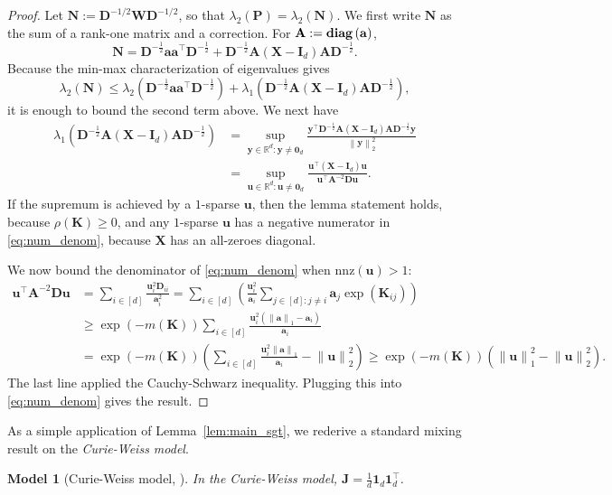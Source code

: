 \documentclass[11pt]{article}
\newtheorem{model}{Model}
\newcommand{\defeq}{:=}
\newcommand{\norm}[1]{\left\lVert#1\right\rVert}
\newcommand{\lam}{\lambda}
\newcommand{\R}{\mathbb{R}}
\newcommand{\diag}[1]{\textbf{\textup{diag}}\left(#1\right)}
\newcommand{\half}{\frac{1}{2}}
\newcommand{\1}{\mathbf{1}}
\newcommand{\0}{\mathbf{0}}
\newcommand{\id}{\mathbf{I}}
\newcommand{\Par}[1]{\left(#1\right)}
\newcommand{\nnz}{\mathrm{nnz}}
\newcommand{\ma}{{\mathbf{A}}}
\newcommand{\md}{{\mathbf{D}}}
\newcommand{\mj}{{\mathbf{J}}}
\newcommand{\mk}{{\mathbf{K}}}
\newcommand{\mn}{{\mathbf{N}}}
\newcommand{\mpp}{{\mathbf{P}}}
\newcommand{\mw}{{\mathbf{W}}}
\newcommand{\mx}{{\mathbf{X}}}
\newcommand{\va}{{\mathbf{a}}}
\newcommand{\vu}{{\mathbf{u}}}
\newcommand{\vy}{{\mathbf{y}}}
\begin{document}
\begin{proof}
Let $\mn \defeq \md^{-1/2}\mw\md^{-1/2}$, so that $\lam_2(\mpp) = \lam_2(\mn)$.
We first write $\mn$ as the sum of a rank-one matrix and a correction. For $\ma \defeq \diag{\va}$,
\[\mn = \md^{-\half}\va\va^\top \md^{-\half} + \md^{-\half}\ma \Par{\mx - \id_d}\ma\md^{-\half}.\]
Because the min-max characterization of eigenvalues gives
\[\lam_2\Par{\mn} \le \lam_2\Par{\md^{-\half}\va\va^\top\md^{-\half}} + \lam_1\Par{ \md^{-\half}\ma \Par{\mx - \id_d}\ma\md^{-\half}},\]
it is enough to bound the second term above.
We next have
\begin{equation}\label{eq:num_denom}\begin{aligned}\lam_1\Par{ \md^{-\half}\ma \Par{\mx - \id_d}\ma\md^{-\half}} &= \sup_{\vy \in \R^d: \vy \neq \0_d} \frac{\vy^\top\md^{-\half}\ma(\mx - \id_d)\ma\md^{-\half}\vy}{\norm{\vy}_2^2} \\ 
&= \sup_{\vu \in \R^d: \vu \neq \0_d} \frac{\vu^\top (\mx - \id_d) \vu}{\vu^\top \ma^{-2}\md\vu}.
\end{aligned}\end{equation}
If the supremum is achieved by a $1$-sparse $\vu$, then the lemma statement holds, because $\rho(\mk) \ge 0$, and any $1$-sparse $\vu$ has a negative numerator in \eqref{eq:num_denom}, because $\mx$ has an all-zeroes diagonal.

We now bound the denominator of \eqref{eq:num_denom} when $\nnz(\vu) > 1$:
\begin{align*}
\vu^\top \ma^{-2} \md \vu &= \sum_{i \in [d]} \frac{\vu_i^2 \md_{ii}}{\va_i^2} = \sum_{i \in [d]} \Par{\frac{\vu_i^2}{\va_i} \sum_{j \in [d]: j \neq i} \va_j \exp(\mk_{ij})} \\
&\ge \exp\Par{-m(\mk)} \sum_{i \in [d]} \frac{\vu_i^2 (\norm{\va}_1 - \va_i)}{\va_i} \\
&= \exp\Par{-m(\mk)} \Par{\sum_{i \in [d]} \frac{\vu_i^2\norm{\va}_1}{\va_i} - \norm{\vu}_2^2 } \ge \exp\Par{-m(\mk)} \Par{\norm{\vu}_1^2 - \norm{\vu}_2^2}.
\end{align*}
The last line applied the Cauchy-Schwarz inequality. Plugging this into \eqref{eq:num_denom} gives the result.
\end{proof}

As a simple application of Lemma~\ref{lem:main_sgt}, we rederive a standard mixing result on the \emph{Curie-Weiss model}.

\begin{model}[Curie-Weiss model, \cite{Weiss07, Ellis12}]\label{model:cw}
In the \emph{Curie-Weiss model}, $\mj = \frac 1 d \1_d\1_d^\top$.
\end{model}
\end{document}
